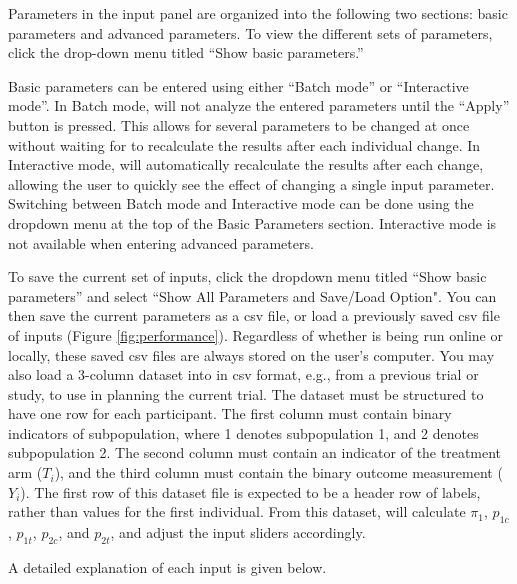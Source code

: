 \documentclass[article]{jss}
\begin{document}
Parameters in the input panel are organized into the following two sections: basic parameters and advanced parameters. To view the different sets of parameters, click the drop-down menu titled ``Show basic parameters.'' 

Basic parameters can be entered using either ``Batch mode'' or ``Interactive mode''. In Batch mode,  will not analyze the entered parameters until the ``Apply'' button is pressed. This allows for several parameters to be changed at once without waiting for  to recalculate the results after each individual change. In Interactive mode,  will automatically recalculate the results after each change, allowing the user to quickly see the effect of changing a single input parameter. Switching between Batch mode and Interactive mode can be done using the dropdown menu at the top of the Basic Parameters section. Interactive mode is not available when entering advanced parameters.

To save the current set of inputs, click the dropdown menu titled ``Show basic parameters'' and select ``Show All Parameters and Save/Load Option". You can then save the current parameters as a csv file, or load a previously saved csv file of inputs (Figure \ref{fig:performance}). Regardless of whether  is being run online or locally, these saved csv files are always stored on the user's computer. You may also load a 3-column dataset into  in csv format, e.g., from a previous trial or study, to use in planning the current trial. The dataset must be structured to have one row for each participant. The first column must contain binary indicators of subpopulation, where 1 denotes subpopulation 1, and 2 denotes subpopulation 2. The second column must contain an indicator of the treatment arm ($T_i$), and the third column must contain the binary outcome measurement ($Y_i$). The first row of this dataset file is expected to be a header row of labels, rather than values for the first individual. From this dataset,  will calculate $π_1$, $p_{1c}$, $p_{1t}$, $p_{2c}$, and $p_{2t}$, and adjust the input sliders accordingly.

A detailed explanation of each input is given below.
\end{document}
